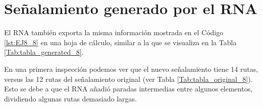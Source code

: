 \section{Señalamiento generado por el RNA}

    El RNA también exporta la misma información mostrada en el Código \ref{lst:EJ8_8} en una hoja de cálculo, similar a la que se visualiza en la Tabla \ref{Tab:tabla_generated_8}.
    
    \begin{table}[H]
        {
        \caption{Tabla de enclavamiento del ejemplo 8 generada por el RNA.}
        \label{Tab:tabla_generated_8}
        \centering
     }
    \end{table}
    
    En una primera inspección podemos ver que el nuevo señalamiento tiene 14 rutas, versus las 12 rutas del señalamiento original (ver Tabla \ref{Tab:tabla_original_8}). Esto se debe a que el RNA añadió paradas intermedias entre algunos elementos, dividiendo algunas rutas demasiado largas.